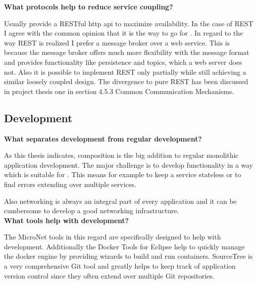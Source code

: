 \noindent
\textbf{What protocols help to reduce service coupling?}

Usually \mss{} provide a RESTful \gls{http} \gls{api} to maximize availability.
In the case of REST I agree with the common opinion that it is the way to go for
\mss{}. In regard to the way REST is realized I prefer a message broker over a
web service. This is because the message broker offers much more flexibility with
the message format and provides functionality like persistence and topics, which
a web server does not. Also it is possible to implement REST only partially
while still achieving a similar loosely coupled design. The divergence to pure
REST has been discussed in project thesis one \cite{biedermann2015project1} in
section 4.5.3 Common Communication Mechanisms.\\

\subsection{\ms{} Development}

\noindent
\textbf{What separates \ms{} development from regular development?}

As this thesis indicates, \ms{} composition is the big addition to regular
monolithic application development. The major challenge is to develop
functionality in a way which is suitable for \mss{}. This means for example to
keep a service stateless or to find errors extending over multiple services. 

Also networking is always an integral part of every \ms{} application and it
can be cumbersome to develop a good networking infrastructure.\\

\noindent
\textbf{What tools help with \ms{} development?}

The MicroNet tools in this regard are specifically designed to help with \ms{}
development. Additionally the Docker Tools for Eclipse help to quickly manage
the docker engine by providing wizards to build and run containers. SourceTree
is a very comprehensive Git tool and greatly helps to keep track of \ms{}
application version control since they often extend over multiple Git
repositories.

